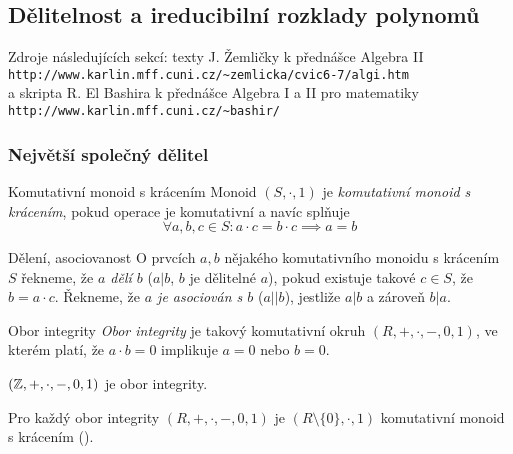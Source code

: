 \subsection{Dělitelnost a ireducibilní rozklady polynomů}

\begin{center}
Zdroje následujících sekcí: texty J. Žemličky k přednášce Algebra II\\
\texttt{http://www.karlin.mff.cuni.cz/\~{}zemlicka/cvic6-7/algi.htm}\\
a skripta R. El Bashira k přednášce Algebra I a II pro matematiky\\
\texttt{http://www.karlin.mff.cuni.cz/\~{}bashir/}\\
\end{center}

\subsubsection*{Největší společný dělitel}

\begin{definiceN}{Komutativní monoid s krácením}
Monoid $(S,\cdot, 1)$ je \emph{komutativní monoid s krácením}, pokud operace \uv{$\cdot$} je komutativní a navíc splňuje $$\forall a,b,c\in S: a\cdot c=b\cdot c\implies a = b$$
\end{definiceN}

\begin{definiceN}{Dělení, asociovanost}
O prvcích $a,b$ nějakého komutativního monoidu s krácením $S$ řekneme, že \emph{$a$ dělí $b$} ($a|b$, $b$ je dělitelné $a$), pokud existuje takové $c\in S$, že $b=a\cdot c$. Řekneme, že \emph{$a$ je asociován s $b$} ($a||b$), jestliže $a|b$ a zároveň $b|a$.
\end{definiceN}

\begin{definiceN}{Obor integrity}
\emph{Obor integrity} je takový komutativní okruh $(R,+,\cdot,-,0,1)$, ve kterém platí, že $a\cdot b=0$ implikuje $a=0$ nebo $b=0$.
\end{definiceN}

\begin{priklady}
\begin{penumerate}
    \item $(\mathbb{Z},+,\cdot,-,0,1)$ je obor integrity.
    \item Pro každý obor integrity $(R,+,\cdot,-,0,1)$ je $(R\setminus\{0\},\cdot,1)$ komutativní monoid s krácením ().
\end{penumerate}
\end{priklady}

